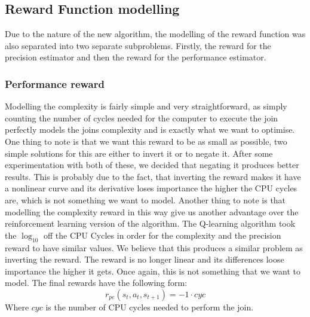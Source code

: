 \subsection{Reward Function modelling}
Due to the nature of the new algorithm, the modelling of the reward function was also separated into two separate subproblems. Firstly, the reward for the precision estimator and then the reward for the performance estimator.
\subsubsection{Performance reward}
Modelling the complexity is fairly simple and very straightforward, as simply counting the number of cycles needed for the computer to execute the join perfectly models the joins complexity and is exactly what we want to optimise. One thing to note is that we want this reward to be as small as possible, two simple solutions for this are either to invert it or to negate it. After some experimentation with both of these, we decided that negating it produces better results. This is probably due to the fact, that inverting the reward makes it have a nonlinear curve and its derivative loses importance the higher the CPU cycles are, which is not something we want to model. Another thing to note is that modelling the complexity reward in this way give us another advantage over the reinforcement learning version of the algorithm. The Q-learning algorithm took the $\log_{10}$ off the CPU Cycles in order for the complexity and the precision reward to have similar values. We believe that this produces a similar problem as inverting the reward. The reward is no longer linear and its differences loose importance the higher it gets. Once again, this is not something that we want to model. The final rewards have the following form:
\begin{equation}
	r_{pe}(s_t,a_t,s_{t+1}) = -1 \cdot cyc
\end{equation}
Where $cyc$ is the number of CPU cycles needed to perform the join.
